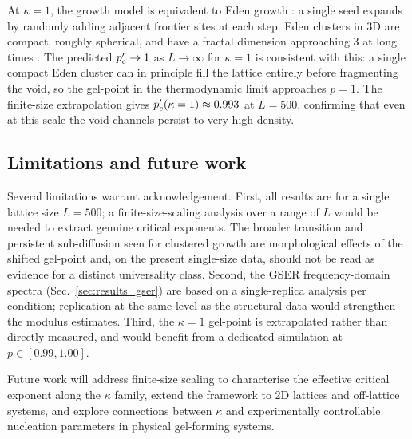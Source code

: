 At $\kappa = 1$, the growth model is equivalent to Eden growth \citep{Eden1961}: a single seed expands by randomly adding adjacent frontier sites at each step. Eden clusters in 3D are compact, roughly spherical, and have a fractal dimension approaching 3 at long times \citep{Jullien1985}. The predicted $p_c' \to 1$ as $L \to \infty$ for $\kappa = 1$ is consistent with this: a single compact Eden cluster can in principle fill the lattice entirely before fragmenting the void, so the gel-point in the thermodynamic limit approaches $p = 1$. The finite-size extrapolation gives $p_c'(\kappa=1) \approx 0.993$ at $L = 500$, confirming that even at this scale the void channels persist to very high density.

\subsection{Limitations and future work}

Several limitations warrant acknowledgement. First, all results are for a single lattice size $L = 500$; a finite-size-scaling analysis over a range of $L$ would be needed to extract genuine critical exponents. The broader transition and persistent sub-diffusion seen for clustered growth are morphological effects of the shifted gel-point and, on the present single-size data, should not be read as evidence for a distinct universality class. Second, the GSER frequency-domain spectra (Sec.~\ref{sec:results_gser}) are based on a single-replica analysis per condition; replication at the same level as the structural data would strengthen the modulus estimates. Third, the $\kappa = 1$ gel-point is extrapolated rather than directly measured, and would benefit from a dedicated simulation at $p \in [0.99, 1.00]$.

Future work will address finite-size scaling to characterise the effective critical exponent along the $\kappa$ family, extend the framework to 2D lattices and off-lattice systems, and explore connections between $\kappa$ and experimentally controllable nucleation parameters in physical gel-forming systems.

